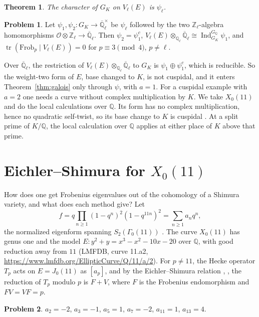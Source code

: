 \documentclass[reqno]{amsart}
\theoremstyle{definition}
\newtheorem{problem}{Problem}[section]
\theoremstyle{plain}
\newtheorem{theorem}{Theorem}[section]
\newcommand{\Z}{\mathbb{Z}}
\newcommand{\Q}{\mathbb{Q}}
\newcommand{\Qlb}{\overline{\Q}_\ell}
\newcommand{\Oc}{\mathcal{O}}
\newcommand{\Frob}{\mathrm{Frob}}
\newcommand{\Ind}{\operatorname{Ind}}
\newcommand{\tr}{\operatorname{tr}}
\begin{document}
\begin{theorem}\label{thm:deuring}
The character of \(G_K\) on \(V_\ell(E)\) is \(\psi_\ell\).
\end{theorem}

\begin{problem}\label{pr:induced}
Let \(\psi_1, \psi_2 \colon G_K \to \Qlb^\times\) be \(\psi_\ell\) followed by the two \(\Z_\ell\)-algebra homomorphisms \(\Oc \otimes \Z_\ell \to \Qlb\).  Then \(\psi_2 = \psi_1^c\), \(V_\ell(E) \otimes_{\Q_\ell} \Qlb \cong \Ind_{G_K}^{G_\Q} \psi_1\), and \(\tr(\Frob_p \mid V_\ell(E)) = 0\) for \(p \equiv 3 \pmod 4\), \(p \ne \ell\).
\end{problem}

Over \(\Qlb\), the restriction of \(V_\ell(E) \otimes_{\Q_\ell} \Qlb\) to \(G_K\) is \(\psi_1 \oplus \psi_1^c\), which is reducible.  So the weight-two form of \(E\), base changed to \(K\), is not cuspidal, and it enters Theorem~\ref{thm:galois} only through \(\psi\), with \(a = 1\).  For a cuspidal example with \(a = 2\) one needs a curve without complex multiplication by \(K\).  We take \(X_0(11)\) and do the local calculations over \(\Q\).  Its form has no complex multiplication, hence no quadratic self-twist, so its base change to \(K\) is cuspidal \cite[Ch.~3]{AC}.  At a split prime of \(K/\Q\), the local calculation over \(\Q\) applies at either place of \(K\) above that prime.

\section{Eichler--Shimura for \texorpdfstring{\(X_0(11)\)}{X0(11)}}\label{sec:es}

How does one get Frobenius eigenvalues out of the cohomology of a Shimura variety, and what does each method give?  Let
\[
  f = q \prod_{n \ge 1} (1 - q^n)^2 (1 - q^{11n})^2 = \sum_{n \ge 1} a_n q^n ,
\]
the normalized eigenform spanning \(S_2(\Gamma_0(11))\) \cite{DS}.  The curve \(X_0(11)\) has genus one and the model \(E \colon y^2 + y = x^3 - x^2 - 10x - 20\) over \(\Q\), with good reduction away from \(11\) (LMFDB, curve 11.a2, \url{https://www.lmfdb.org/EllipticCurve/Q/11/a/2}).  For \(p \ne 11\), the Hecke operator \(T_p\) acts on \(E = J_0(11)\) as \([a_p]\), and by the Eichler--Shimura relation \cite[Thm.~8.7.2]{DS}, \cite[Thm.~7.9]{Sh}, the reduction of \(T_p\) modulo \(p\) is \(F + V\), where \(F\) is the Frobenius endomorphism and \(FV = VF = p\).

\begin{problem}\label{pr:coeffs}
\(a_2 = -2\), \(a_3 = -1\), \(a_5 = 1\), \(a_7 = -2\), \(a_{11} = 1\), \(a_{13} = 4\).
\end{problem}
\end{document}
